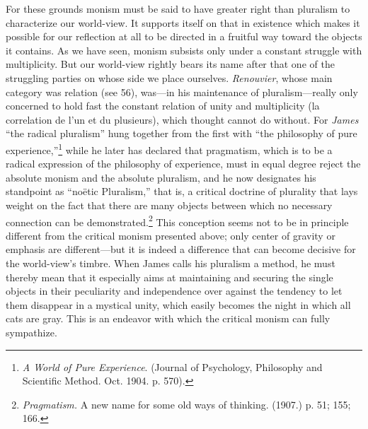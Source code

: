 \documentclass[12pt,a4paper]{book}
\newcommand{\opage}[1]{\marginnote{\footnotesize\textit{[#1]}}}
\begin{document}
For these grounds monism must be said to have greater right than pluralism to characterize our
world-view. It supports itself on that in existence which makes it possible for our reflection at all
to be directed in a fruitful way toward the objects it contains. As we have seen, monism subsists only
under a constant struggle with multiplicity. But our world-view rightly bears its name after that one
of the struggling parties on whose side we place ourselves. \emph{Renouvier}, whose main category was
relation (see 56), was---in his maintenance of pluralism---really only concerned to hold fast the
constant relation of unity and multiplicity (la correlation de l'un et du plusieurs), which thought
cannot do without. For \emph{James} ``the radical pluralism'' hung together from the first with ``the
\opage{326}philosophy of pure experience,''\footnote{\emph{A World of Pure Experience}. (Journal of Psychology,
Philosophy and Scientific Method. Oct. 1904. p. 570).} while he later has declared that pragmatism,
which is to be a radical expression of the philosophy of experience, must in equal degree reject the
absolute monism and the absolute pluralism, and he now designates his standpoint as ``noëtic
Pluralism,'' that is, a critical doctrine of plurality that lays weight on the fact that there are many
objects between which no necessary connection can be demonstrated.\footnote{\emph{Pragmatism.} A new name for some old ways of thinking. (1907.) p. 51; 155; 166.} This conception seems not to be in principle
different from the critical monism presented above; only center of gravity or emphasis are
different---but it is indeed a difference that can become decisive for the world-view's timbre. When
James calls his pluralism a method, he must thereby mean that it especially aims at maintaining and
securing the single objects in their peculiarity and independence over against the tendency to let them
disappear in a mystical unity, which easily becomes the night in which all cats are gray. This is an
endeavor with which the critical monism can fully sympathize.
\end{document}
